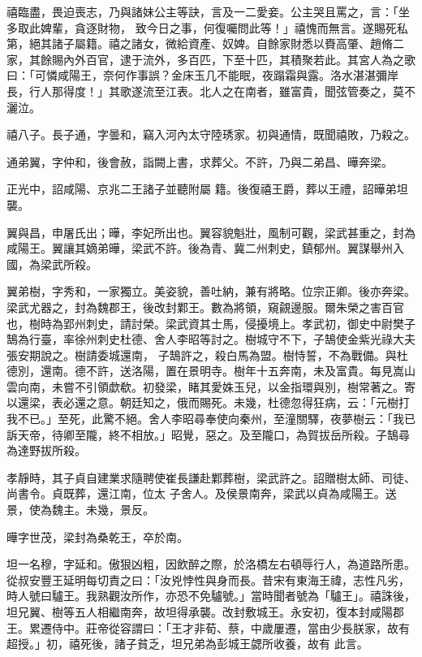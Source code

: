 \begin{pinyinscope}
 禧臨盡，畏迫喪志，乃與諸妹公主等訣，言及一二愛妾。公主哭且罵之，言：「坐多取此婢輩，貪逐財物，
 致今日之事，何復囑問此等！」禧愧而無言。遂賜死私第，絕其諸子屬籍。禧之諸女，微給資產、奴婢。自餘家財悉以賚高肇、趙脩二家，其餘賜內外百官，逮于流外，多百匹，下至十匹，其積聚若此。其宮人為之歌曰：「可憐咸陽王，奈何作事誤？金床玉几不能眠，夜蹋霜與露。洛水湛湛彌岸長，行人那得度！」其歌遂流至江表。北人之在南者，雖富貴，聞弦管奏之，莫不灑泣。



 禧八子。長子通，字曇和，竊入河內太守陸琇家。初與通情，既聞禧敗，乃殺之。



 通弟翼，字仲和，後會赦，詣闕上書，求葬父。不許，乃與二弟昌、曄奔梁。



 正光中，詔咸陽、京兆二王諸子並聽附屬
 籍。後復禧王爵，葬以王禮，詔曄弟坦襲。



 翼與昌，申屠氏出；曄，李妃所出也。翼容貌魁壯，風制可觀，梁武甚重之，封為咸陽王。翼讓其嫡弟曄，梁武不許。後為青、冀二州刺史，鎮郁州。翼謀舉州入國，為梁武所殺。



 翼弟樹，字秀和，一家獨立。美姿貌，善吐納，兼有將略。位宗正卿。後亦奔梁。梁武尤器之，封為魏郡王，後改封鄴王。數為將領，窺覦邊服。爾朱榮之害百官也，樹時為郢州刺史，請討榮。梁武資其士馬，侵擾境上。孝武初，御史中尉樊子鵠為行臺，率徐州刺史杜德、舍人李昭等討之。樹城守不下，子鵠使金紫光祿大夫張安期說之。樹請委城還南，
 子鵠許之，殺白馬為盟。樹恃誓，不為戰備。與杜德別，還南。德不許，送洛陽，置在景明寺。樹年十五奔南，未及富貴。每見嵩山雲向南，未嘗不引領歔欷。初發梁，睹其愛姝玉兒，以金指環與別，樹常著之。寄以還梁，表必還之意。朝廷知之，俄而賜死。未幾，杜德忽得狂病，云：「元樹打我不已。」至死，此驚不絕。舍人李昭尋奉使向秦州，至潼關驛，夜夢樹云：「我已訴天帝，待卿至隴，終不相放。」昭覺，惡之。及至隴口，為賀拔岳所殺。子鵠尋為達野拔所殺。



 孝靜時，其子貞自建業求隨聘使崔長謙赴鄴葬樹，梁武許之。詔贈樹太師、司徒、尚書令。貞既葬，還江南，位太
 子舍人。及侯景南奔，梁武以貞為咸陽王。送景，使為魏主。未幾，景反。



 曄字世茂，梁封為桑乾王，卒於南。



 坦一名穆，字延和。傲狠凶粗，因飲醉之際，於洛橋左右頓辱行人，為道路所患。從叔安豐王延明每切責之曰：「汝兇悖性與身而長。昔宋有東海王禕，志性凡劣，時人號曰驢王。我熟觀汝所作，亦恐不免驢號。」當時聞者號為「驢王」。禧誅後，坦兄翼、樹等五人相繼南奔，故坦得承襲。改封敷城王。永安初，復本封咸陽郡王。累遷侍中。莊帝從容謂曰：「王才非荀、蔡，中歲屢遷，當由少長朕家，故有超授。」初，禧死後，諸子貧乏，坦兄弟為彭城王勰所收養，故有
 此言。




\end{pinyinscope}
